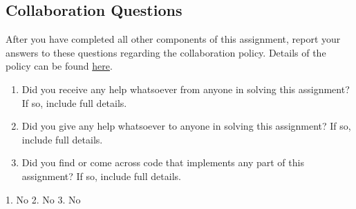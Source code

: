 \documentclass[11pt,addpoints,answers]{exam}
\begin{document}
\begin{questions}
\newpage
\newpage
\section{Collaboration Questions}
After you have completed all other components of this assignment, report your answers to these questions regarding the collaboration policy. Details of the policy can be found \href{http://www.cs.cmu.edu/~mgormley/courses/10601/syllabus.html}{here}.
\begin{enumerate}
    \item Did you receive any help whatsoever from anyone in solving this assignment? If so, include full details.
    \item Did you give any help whatsoever to anyone in solving this assignment? If so, include full details.
    \item Did you find or come across code that implements any part of this assignment? If so, include full details.
\end{enumerate}

\begin{your_solution}[height=6cm]
1. No
2. No
3. No

\end{your_solution}
\newpage
\end{questions}
\end{document}
